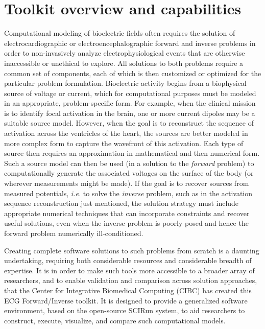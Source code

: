 \section{Toolkit overview and capabilities}
    
Computational modeling of bioelectric fields often requires the solution of
electrocardiographic or electroencephalographic forward and inverse
problems in order to non-invasively analyze electrophysiological events
that are otherwise inaccessible or unethical to explore. All solutions to
both problems require a common set of components, each of which is then
customized or optimized for the particular problem formulation.
Bioelectric activity begins from a biophysical source of voltage or current,
which for computational purposes must be modeled in an appropriate,
problem-specific form. For example, when the clinical mission is to
identify focal activation in the brain, one or more current dipoles may be
a suitable source model. However, when the goal is to reconstruct the
sequence of activation across the ventricles of the heart, the sources are
better modeled in more complex form to capture the wavefront of this
activation. Each type of source then requires an approximation in
mathematical and then numerical form. Such a source model can then be used
(in a solution to the \textit{forward} problem) to computationally generate
the associated voltages on the surface of the body (or wherever
measurements might be made). If the goal is to recover sources from
measured potentials, \textit{i.e.} to solve the \textit{inverse} problem,
such as in the activation sequence reconstruction just mentioned, the
solution strategy must include appropriate numerical techniques that can
incorporate constraints and recover useful solutions, even when the inverse
problem is poorly posed and hence the forward problem numerically ill-conditioned.

Creating complete software solutions to such problems from scratch is a
daunting undertaking, requiring both considerable resources and considerable
breadth of expertise. It is in order to make such tools more accessible to
a broader array of researchers, and to enable validation and comparison
across solution approaches, that the Center for Integrative Biomedical
Computing (CIBC) has created this ECG Forward/Inverse toolkit. It is
designed to provide a generalized software environment, based on the open-source
SCIRun system, to aid researchers to construct, execute, visualize,
and compare such computational models.

